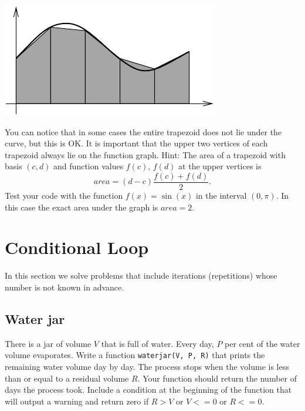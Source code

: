 \begin{center}
\includegraphics[height=0.3\textwidth]{img/riem.pdf}
\end{center}
\noindent
You can notice that in some cases the entire trapezoid does not lie 
under the curve, but this is OK. It is important that the upper two vertices 
of each trapezoid always lie on the function graph.
Hint: The area of a trapezoid with basis $(c, d)$ and function 
values $f(c),\, f(d)$ at the upper vertices is 
$$
area = (d - c)\frac{f(c) + f(d)}{2}.
$$
Test your code with the function $f(x) = \sin(x)$ in the interval $(0, \pi)$.
In this case the exact area under the graph is $area = 2$.


\section{Conditional Loop}

In this section we solve problems that include iterations (repetitions) whose
number is not known in advance.


\subsection{Water jar}

There is a jar of volume $V$ that is full of water. Every day, 
$P$ per cent of the water volume evaporates. Write a function 
{\tt waterjar(V, P, R)} that prints the remaining water volume day
by day. The process stops when the volume is less than or equal to 
a residual volume $R$. Your function should return the number of 
days the process took. Include a condition at the beginning 
of the function that will output a warning and return zero 
if $R > V$ or $V <= 0$ or $R <= 0$.


